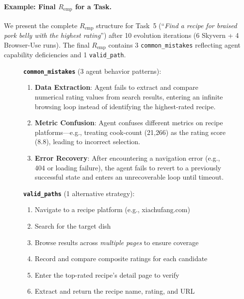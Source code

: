 \paragraph{Example: Final $R_{\text{emp}}$ for a Task.} We present the complete $R_{\text{emp}}$ structure for Task~5 (``\textit{Find a recipe for braised pork belly with the highest rating}'') after 10 evolution iterations (6 Skyvern + 4 Browser-Use runs). The final $R_{\text{emp}}$ contains 3 \texttt{common\_mistakes} reflecting agent capability deficiencies and 1 \texttt{valid\_path}.

\begin{figure}[h]
\centering
\begin{tcolorbox}[colback=gray!5, colframe=gray!50, title={\textbf{Example}: Empirical Patterns for Task ``Find the highest-rated braised pork belly recipe''}]

\textbf{\texttt{common\_mistakes}} (3 agent behavior patterns):

\begin{enumerate}[leftmargin=*, itemsep=2pt]
  \item \textbf{Data Extraction}: Agent fails to extract and compare numerical rating values from search results, entering an infinite browsing loop instead of identifying the highest-rated recipe.
  \item \textbf{Metric Confusion}: Agent confuses different metrics on recipe platforms---e.g., treating cook-count (21{,}266) as the rating score (8.8), leading to incorrect selection.
  \item \textbf{Error Recovery}: After encountering a navigation error (e.g., 404 or loading failure), the agent fails to revert to a previously successful state and enters an unrecoverable loop until timeout.
\end{enumerate}

\vspace{4pt}
\textbf{\texttt{valid\_paths}} (1 alternative strategy):

\begin{enumerate}[leftmargin=*, itemsep=2pt]
  \item Navigate to a recipe platform (e.g., xiachufang.com)
  \item Search for the target dish
  \item Browse results across \emph{multiple pages} to ensure coverage
  \item Record and compare composite ratings for each candidate
  \item Enter the top-rated recipe's detail page to verify
  \item Extract and return the recipe name, rating, and URL
\end{enumerate}


\end{tcolorbox}
\end{figure}

